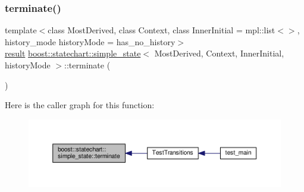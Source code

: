\mbox{\label{classboost_1_1statechart_1_1simple__state_af1b306e54db708323280093a4452da13}} 
\subsubsection{\texorpdfstring{terminate()}{terminate()}}
{\footnotesize\ttfamily template$<$class Most\+Derived, class Context, class Inner\+Initial = mpl\+::list$<$$>$, history\+\_\+mode history\+Mode = has\+\_\+no\+\_\+history$>$ \\
\mbox{\hyperlink{namespaceboost_1_1statechart_abe807f6598b614d6d87bb951ecd92331}{result}} \mbox{\hyperlink{classboost_1_1statechart_1_1simple__state}{boost\+::statechart\+::simple\+\_\+state}}$<$ Most\+Derived, Context, Inner\+Initial, history\+Mode $>$\+::terminate (\begin{DoxyParamCaption}{ }\end{DoxyParamCaption})\hspace{0.3cm}{\ttfamily [inline]}}

Here is the caller graph for this function\+:
\nopagebreak
\begin{figure}[H]
\begin{center}
\leavevmode
\includegraphics[width=350pt]{classboost_1_1statechart_1_1simple__state_af1b306e54db708323280093a4452da13_icgraph}
\end{center}
\end{figure}
\mbox{\label{classboost_1_1statechart_1_1simple__state_aa0865d4f3f3763e77dfd86f70aa558af}} 

